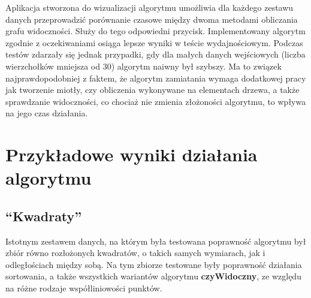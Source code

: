 \documentclass{article}
\begin{document}
\noindent \qquad  Aplikacja stworzona do wizualizacji algorytmu umożliwia dla każdego zestawu danych przeprowadzić porównanie czasowe między dwoma metodami obliczania grafu widoczności. Służy do tego odpowiedni przycisk. Implementowany algorytm zgodnie z oczekiwaniami osiąga lepsze wyniki w teście wydajnościowym. Podczas testów zdarzały się jednak przypadki, gdy dla małych danych wejściowych (liczba wierzchołków mniejsza od 30) algorytm naiwny był szybszy. Ma to związek najprawdopodobniej z faktem, że algorytm zamiatania wymaga dodatkowej pracy jak tworzenie miotły, czy obliczenia wykonywane na elementach drzewa, a także sprawdzanie widoczności, co chociaż nie zmienia złożoności algorytmu, to wpływa na jego czas działania.

\newpage

\section{Przykładowe wyniki działania algorytmu}

\subsection{``Kwadraty''}
\qquad Istotnym zestawem danych, na którym była testowana poprawność algorytmu był zbiór równo rozłożonych kwadratów, o takich samych wymiarach, jak i odległościach między sobą. Na tym zbiorze testowane były poprawność działania sortowania, a także wszystkich wariantów algorytmu \textbf{czyWidoczny}, ze względu na różne rodzaje współliniowości punktów.
\end{document}
